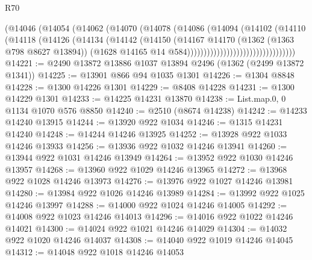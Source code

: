 \begin{lexlean}{R70}
\begin{coremodule}
                                      (@14046
                                        (@14054
                                          (@14062
                                            (@14070
                                              (@14078
                                                (@14086
                                                  (@14094
                                                    (@14102
                                                      (@14110
                                                        (@14118
                                                          (@14126
                                                            (@14134
                                                              (@14142
                                                                (@14150
                                                                  (@14167
                                                                    @14170
                                                                    (@1362
                                                                      (@1363 @798 @8627 @13894))
                                                                    (@1628
                                                                      @14165
                                                                      @14
                                                                      @584)))))))))))))))))))))))))))))))))
@14221 := @2490 @13872 @13886 @1037 @13894 @2496 (@1362 (@2499 @13872 @1341))
@14225 := @13901 @866 @94 @1035 @1301
@14226 := @1304 @8848
@14228 := @1300 @14226 @1301
@14229 := @8408 @14228
@14231 := @1300 @14229 @1301
@14233 := @14225 @14231 @13870
@14238 := List.map.{0, 0} @1134 @1070 @576 @8850
@14240 := @2510 (@8674 @14238)
@14242 := @14233 @14240 @13915
@14244 := @13920 @922 @1034
@14246 := @1315 @14231 @14240
@14248 := @14244 @14246 @13925
@14252 := @13928 @922 @1033 @14246 @13933
@14256 := @13936 @922 @1032 @14246 @13941
@14260 := @13944 @922 @1031 @14246 @13949
@14264 := @13952 @922 @1030 @14246 @13957
@14268 := @13960 @922 @1029 @14246 @13965
@14272 := @13968 @922 @1028 @14246 @13973
@14276 := @13976 @922 @1027 @14246 @13981
@14280 := @13984 @922 @1026 @14246 @13989
@14284 := @13992 @922 @1025 @14246 @13997
@14288 := @14000 @922 @1024 @14246 @14005
@14292 := @14008 @922 @1023 @14246 @14013
@14296 := @14016 @922 @1022 @14246 @14021
@14300 := @14024 @922 @1021 @14246 @14029
@14304 := @14032 @922 @1020 @14246 @14037
@14308 := @14040 @922 @1019 @14246 @14045
@14312 := @14048 @922 @1018 @14246 @14053

\end{coremodule}
\end{lexlean}
